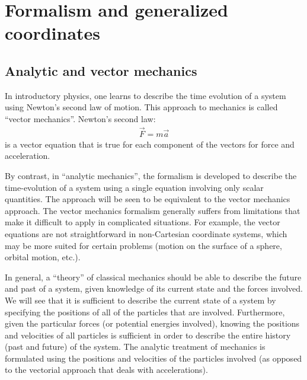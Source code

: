 %
\chapter{Formalism and generalized coordinates}
\section{Analytic and vector mechanics}
In introductory physics, one learns to describe the time evolution of a system using Newton's second law of motion. This approach to mechanics is called ``vector mechanics''. Newton's second law:
\begin{align}
\vec{F}=m\vec{a}
\label{eqn:Fma}
\end{align}
is a vector equation that is true for each component of the vectors for force and acceleration.

\noindent
By contrast, in ``analytic mechanics'', the formalism is developed to describe the time-evolution of a system using a single equation involving only scalar quantities. The approach will be seen to be equivalent to the vector mechanics approach. The vector mechanics formalism generally suffers from limitations that make it difficult to apply in complicated situations. For example, the vector equations are not straightforward in non-Cartesian coordinate systems, which may be more suited for certain problems (motion on the surface of a sphere, orbital motion, etc.).

\noindent
In general, a ``theory'' of classical mechanics should be able to describe the future and past of a system, given knowledge of its current state and the forces involved. We will see that it is sufficient to describe the current state of a system by specifying the positions of all of the particles that are involved. Furthermore, given the particular forces (or potential energies involved), knowing the positions and velocities of all particles is sufficient in order to describe the entire history (past and future) of the system. The analytic treatment of mechanics is formulated using the positions and velocities of the particles involved (as opposed to the vectorial approach that deals with accelerations).

